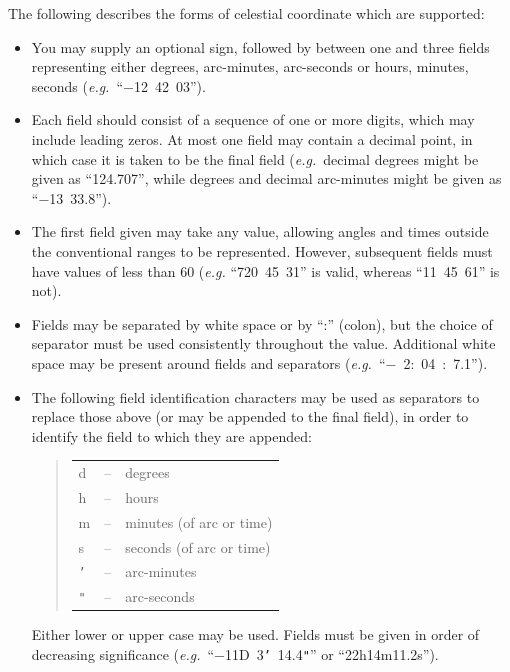 \documentclass[twoside,11pt]{article}
\begin{document}
The following describes the forms of celestial coordinate which are
supported:

\begin{itemize}
\item You may supply an optional sign, followed by between one and
three fields representing either degrees, arc-minutes, arc-seconds or
hours, minutes, seconds ({\em{e.g.}}\ ``$-$12~42~03'').

\item Each field should consist of a sequence of one or more digits,
which may include leading zeros. At most one field may contain a
decimal point, in which case it is taken to be the final field
({\em{e.g.}}\ decimal degrees might be given as ``124.707'', while
degrees and decimal arc-minutes might be given as ``$-$13~33.8'').

\item The first field given may take any value, allowing angles and
times outside the conventional ranges to be represented. However,
subsequent fields must have values of less than 60 ({\em{e.g.}}
``720~45~31'' is valid, whereas ``11~45~61'' is not).

\item Fields may be separated by white space or by ``:'' (colon), but
the choice of separator must be used consistently throughout the
value. Additional white space may be present around fields and
separators ({\em{e.g.}}\ ``$-$~2:~04~:~7.1'').

\item The following field identification characters may be used as
separators to replace those above (or may be appended to the final
field), in order to identify the field to which they are appended:

\begin{quote}
\begin{tabular}{lll}
d & -- & degrees \\
h & -- & hours \\
m & -- & minutes (of arc or time) \\
s & -- & seconds (of arc or time) \\
{\tt{'}} & -- & arc-minutes \\
{\tt{"}} & -- & arc-seconds
\end{tabular}
\end{quote}

Either lower or upper case may be used.  Fields must be given in order
of decreasing significance
({\em{e.g.}}\ ``$-$11D~3{\tt{'}}~14.4{\tt{"}}'' or ``22h14m11.2s'').


\end{itemize}
\end{document}
